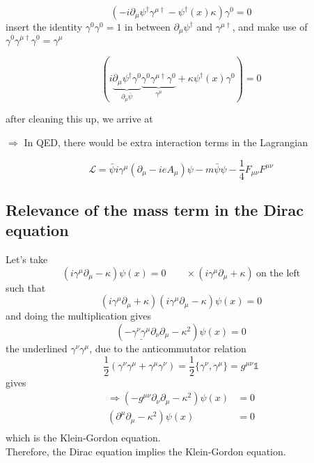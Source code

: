 \documentclass[11pt]{article}
\newcommand{\lag}{\mathcal{L}}
\begin{document}
\[ (-i\partial_\mu\psi^\dagger\gamma^{\mu\dagger} - \psi^\dagger(x)\kappa)\gamma^0 = 0\]
insert the identity $\gamma^0\gamma^0 = 1$ in between $\partial_\mu\psi^\dagger$ and $\gamma^{\mu\dagger}$, and make use of $\gamma^0 \gamma^{\mu\dagger} \gamma^0 = \gamma^\mu$

\[ (i \underbrace{
	\partial_\mu\psi^\dagger\gamma^0}_{\partial_\mu \bar{\psi}} \underbrace{
		\gamma^0 \gamma^{\mu\dagger} \gamma^0 }_{\gamma^\mu} +
	 \kappa \psi^\dagger(x)\gamma^0) = 0\]
		
	after cleaning this up, we arrive at
	
\begin{center}
\end{center}

$\Rightarrow$ In QED, there would be extra interaction terms in the Lagrangian

\[ \lag = \bar{\psi} i \gamma^\mu (\partial_\mu - ieA_\mu)\psi - m\bar{\psi}\psi - \frac{1}{4}F_{\mu\nu}F^{\mu\nu}\]

\subsection*{Relevance of the mass  term in the Dirac equation}

Let's take
\[ (i \gamma^\mu \partial_\mu - \kappa)\psi(x) = 0 \quad \quad \times \left(i\gamma^\mu\partial_\mu + \kappa \right)\ \text{on the left}\]
such that
\[ (i\gamma^\mu \partial_\mu + \kappa)(i\gamma^\mu \partial_\mu - \kappa) \psi(x) = 0\]
and doing the multiplication gives
\[ (-\underline{\gamma^\nu\gamma^\mu} \partial_\nu \partial_\mu - \kappa^2)\psi(x) = 0 \]
the underlined $\gamma^\nu\gamma^\mu$, due to the anticommutator relation
\[ \frac{1}{2}(\gamma^\nu \gamma^\mu + \gamma^\mu\gamma^\nu) = \frac{1}{2} \{\gamma^\nu, \gamma^\mu\} = g^{\mu\nu}\mathbb{1}\]
gives
\begin{align*}
	\Rightarrow (-g^{\mu\nu} \partial_\nu \partial_\mu - \kappa^2) \psi(x) &= 0\\
	(\partial^\mu\partial_\mu - \kappa^2)\psi(x) &= 0\\
\end{align*}  
which is the Klein-Gordon equation.\\

Therefore, the Dirac equation implies the Klein-Gordon equation.
\end{document}
